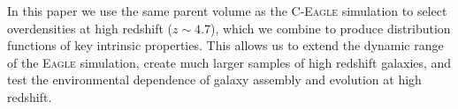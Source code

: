 In this paper we use the same parent volume as the \textsc{C-Eagle} simulation to select overdensities at high redshift ($z \sim 4.7$), which we combine to produce distribution functions of key intrinsic properties.
This allows us to extend the dynamic range of the \textsc{Eagle} simulation, create much larger samples of high redshift galaxies, and test the environmental dependence of galaxy assembly and evolution at high redshift.

